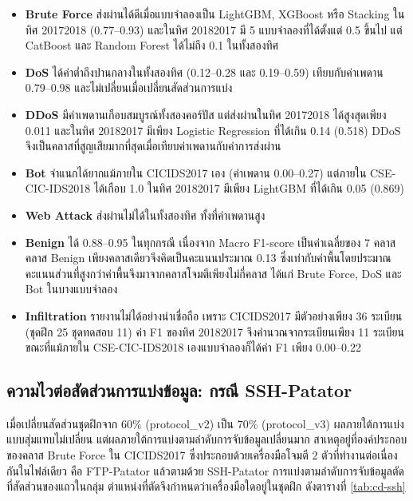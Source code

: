 \begin{itemize}
    \item \textbf{Brute Force} ส่งผ่านได้ดีเมื่อแบบจำลองเป็น LightGBM, XGBoost หรือ Stacking ในทิศ 2017\dirarrow{}2018 (0.77--0.93) และในทิศ 2018\dirarrow{}2017 มี 5 แบบจำลองที่ได้ตั้งแต่ 0.5 ขึ้นไป แต่ CatBoost และ Random Forest ได้ไม่ถึง 0.1 ในทั้งสองทิศ
    \item \textbf{DoS} ได้ค่าต่ำถึงปานกลางในทั้งสองทิศ (0.12--0.28 และ 0.19--0.59) เทียบกับค่าเพดาน 0.79--0.98 และไม่เปลี่ยนเมื่อเปลี่ยนสัดส่วนการแบ่ง
    \item \textbf{DDoS} มีค่าเพดานเกือบสมบูรณ์ทั้งสองคอร์ปัส แต่ส่งผ่านในทิศ 2017\dirarrow{}2018 ได้สูงสุดเพียง 0.011 และในทิศ 2018\dirarrow{}2017 มีเพียง Logistic Regression ที่ได้เกิน 0.14 (0.518) DDoS จึงเป็นคลาสที่สูญเสียมากที่สุดเมื่อเทียบค่าเพดานกับค่าการส่งผ่าน
    \item \textbf{Bot} จำแนกได้ยากแม้ภายใน CICIDS2017 เอง (ค่าเพดาน 0.00--0.27) แต่ภายใน CSE-CIC-IDS2018 ได้เกือบ 1.0 ในทิศ 2018\dirarrow{}2017 มีเพียง LightGBM ที่ได้เกิน 0.05 (0.869)
    \item \textbf{Web Attack} ส่งผ่านไม่ได้ในทั้งสองทิศ ทั้งที่ค่าเพดานสูง
    \item \textbf{Benign} ได้ 0.88--0.95 ในทุกกรณี เนื่องจาก Macro F1-score เป็นค่าเฉลี่ยของ 7 คลาส คลาส Benign เพียงคลาสเดียวจึงคิดเป็นคะแนนประมาณ 0.13 ซึ่งเท่ากับค่าพื้นโดยประมาณ คะแนนส่วนที่สูงกว่าค่าพื้นจึงมาจากคลาสโจมตีเพียงไม่กี่คลาส ได้แก่ Brute Force, DoS และ Bot ในบางแบบจำลอง
    \item \textbf{Infiltration} รายงานไม่ได้อย่างน่าเชื่อถือ เพราะ CICIDS2017 มีตัวอย่างเพียง 36 ระเบียน (ชุดฝึก 25 ชุดทดสอบ 11) ค่า F1 ของทิศ 2018\dirarrow{}2017 จึงคำนวณจากระเบียนเพียง 11 ระเบียน ขณะที่แม้ภายใน CSE-CIC-IDS2018 เองแบบจำลองก็ได้ค่า F1 เพียง 0.00--0.22
\end{itemize}

\subsection{ความไวต่อสัดส่วนการแบ่งข้อมูล: กรณี SSH-Patator}
\label{sec:cd-ssh}

เมื่อเปลี่ยนสัดส่วนชุดฝึกจาก 60\% (protocol\_v2) เป็น 70\% (protocol\_v3) ผลภายใต้การแบ่งแบบสุ่มแทบไม่เปลี่ยน แต่ผลภายใต้การแบ่งตามลำดับการจับข้อมูลเปลี่ยนมาก สาเหตุอยู่ที่องค์ประกอบของคลาส Brute Force ใน CICIDS2017 ซึ่งประกอบด้วยเครื่องมือโจมตี 2 ตัวที่ทำงานต่อเนื่องกันในไฟล์เดียว คือ FTP-Patator แล้วตามด้วย SSH-Patator การแบ่งตามลำดับการจับข้อมูลตัดที่สัดส่วนของแถวในกลุ่ม ตำแหน่งที่ตัดจึงกำหนดว่าเครื่องมือใดอยู่ในชุดฝึก ดังตารางที่ \ref{tab:cd-ssh}

